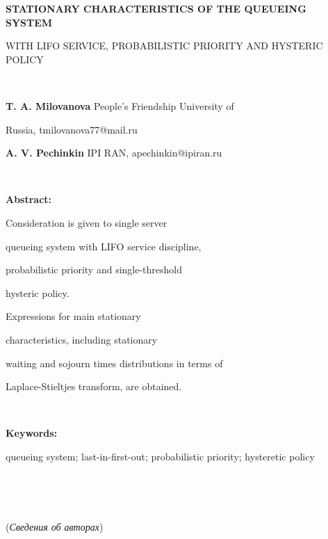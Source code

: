 {\bf STATIONARY CHARACTERISTICS OF THE QUEUEING SYSTEM


WITH LIFO SERVICE, PROBABILISTIC PRIORITY AND HYSTERIC POLICY}





\ \





{\bf T. A. Milovanova} People's Friendship University of


Russia, tmilovanova77@mail.ru





{\bf A. V. Pechinkin} IPI RAN, apechinkin@ipiran.ru








\ \





{\bf Abstract:}


Consideration is given to single server


queueing system with LIFO service discipline,


probabilistic priority and single-threshold


hysteric policy.


Expressions for main stationary


characteristics, including stationary


waiting and sojourn times distributions in terms of


Laplace-Stieltjes transform, are obtained.








\ \





{\bf Keywords:}


queueing system; last-in-first-out; probabilistic priority; hysteretic policy








\ \





\ \





({\it Сведения об авторах})





